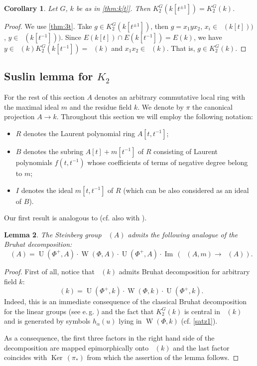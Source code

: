 \documentclass[oneside,12pt]{amsart}
\numberwithin{equation}{section}
\newtheorem{lem}{Lemma}
\numberwithin{lem}{section}
\newtheorem{cor}[lem]{Corollary}
\theoremstyle{definition}
\theoremstyle{remark}
\DeclareMathOperator{\UU}{U}
\DeclareMathOperator{\St}{St^G}
\DeclareMathOperator{\WW}{W}
\DeclareMathOperator{\Bigker}{Ker\,}
\DeclareMathOperator{\im}{Im\,}
\begin{document}
\begin{cor} Let $G$, $k$ be as in \cref{thm:k[t]}. Then $K_2^G(k[t^{\pm 1}])=K_2^G(k)$. \end{cor}
\begin{proof} We use \cref{thm:3t}.
 Take $g\in K_2^G(k[t^{\pm 1}])$,
 then $g=x_1yx_2$, $x_i\in \St(k[t]))$, $y\in \St(k[t^{-1}]))$.
 Since $E(k[t])\cap E(k[t^{-1}])=E(k)$,
 we have $y\in\St(k)K_2^G(k[t^{-1}])=\St(k)$ and $x_1x_2\in\St(k)$. That is, $g\in K_2^G(k)$. \end{proof}
 
\subsection{Suslin lemma for \texorpdfstring{$K_2$}{K\texttwoinferior}}
For the rest of this section $A$ denotes an arbitrary commutative local ring with the maximal ideal $m$ and the residue field $k$.
We denote by $\pi$ the canonical projection $A \rightarrow k$.
Throughout this section we will employ the following notation:
\begin{itemize}
 \item $R$ denotes the Laurent polynomial ring $A[t, t^{-1}]$;
 \item $B$ denotes the subring $A[t] + m[t^{-1}]$ of $R$ consisting of Laurent polynomials $f(t,t^{-1})$ whose coefficients of terms of negative degree belong to $m$;
 \item $I$ denotes the ideal $m[t, t^{-1}]$ of $R$ (which can be also considered as an ideal of $B$). \end{itemize}

Our first result is analogous to \cite[Lemma~3.1(e)]{Tu} (cf. also with \cite[\S~2.3A]{HOM}).
\begin{lem} \label{cor:bruhat} The Steinberg group $\St(A)$ admits the following analogue of the Bruhat decomposition:
\[ \St(A) = \UU(\Phi^+, A) \cdot \WW(\Phi, A) \cdot \UU(\Phi^+, A) \cdot \im(\St(A, m) \rightarrow \St(A)).\] \end{lem}
\begin{proof} First of all, notice that $\St(k)$ admits Bruhat decomposition for arbitrary field $k$:
 $$\St(k) = \UU(\Phi^+, k) \cdot \WW(\Phi, k) \cdot \UU(\Phi^+, k).$$
 Indeed, this is an immediate consequence of the classical Bruhat decomposition for the linear groups (see e.\,g. \cite[Theorem~4]{St-lect}) and the fact
 that $K_2^G(k)$ is central in $\St(k)$ and is generated by symbols $h_\alpha(u)$ lying in $\WW(\Phi, k)$ (cf. \cref{satz1}). 
 
 As a consequence, the first three factors in the right hand side of the decomposition are mapped epimorphically onto $\St(k)$ and the last factor coincides with $\Bigker(\pi_*)$
 from which the assertion of the lemma follows. \end{proof}
\end{document}
